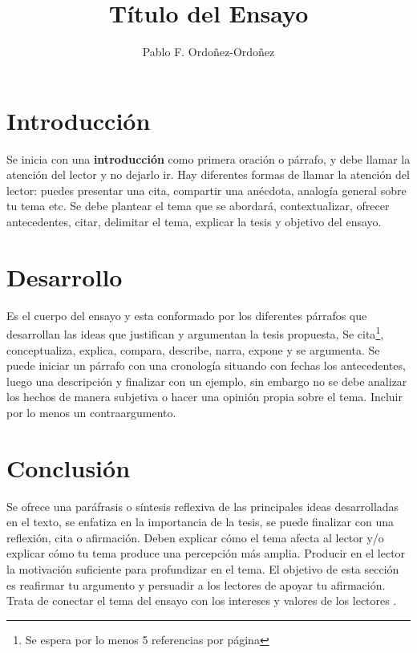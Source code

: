 \documentclass[a4paper,12pt]{article}
\title{Título del Ensayo}
\author[1]{
  Pablo F. Ordoñez-Ordoñez \orcid{0000-0001-8079-7694} 
}
\affil[1]{Universidad Nacional de Loja, Ecuador, Facultad de Energía, CIS, Análisis y Diseño de Sistemas, profesor \href{mailto:pfordonez@unl.edu.ec}{pfordonez@unl.edu.ec}}
\begin{document}
\maketitle

\section{Introducción}

Se inicia con una \textbf{introducción} como primera oración o párrafo, y debe llamar la atención del lector y no dejarlo ir. Hay diferentes formas de llamar la atención del lector: puedes presentar una cita,  compartir una anécdota, analogía general sobre tu tema etc. Se debe plantear el tema que se abordará, contextualizar, ofrecer antecedentes, citar, delimitar el tema, explicar la tesis y objetivo del ensayo.

\section{Desarrollo}
Es el cuerpo del ensayo y esta conformado por los diferentes párrafos que desarrollan las ideas que justifican y argumentan la tesis propuesta, Se cita\footnote{Se espera por lo menos 5 referencias por página}, conceptualiza, explica, compara, describe, narra, expone y se argumenta. Se puede iniciar un párrafo con una cronología situando con fechas los antecedentes, luego una descripción y finalizar con un ejemplo, sin embargo no se debe analizar los hechos de manera subjetiva o hacer una opinión propia sobre el tema. Incluir por lo menos un contraargumento. 

\section{Conclusión}
Se ofrece una paráfrasis o síntesis reflexiva de las principales ideas desarrolladas en el texto, se enfatiza en la importancia de la tesis, se puede finalizar con una reflexión, cita o afirmación. Deben explicar cómo el tema afecta al lector y/o explicar cómo tu tema produce una percepción más amplia. Producir en el lector la motivación suficiente para profundizar en el tema. El objetivo de esta sección es reafirmar tu argumento y persuadir a los lectores de apoyar tu afirmación. Trata de conectar el tema del ensayo con los intereses y valores de los lectores \cite{youArg} \cite{web1}.


\medskip


\end{document}
